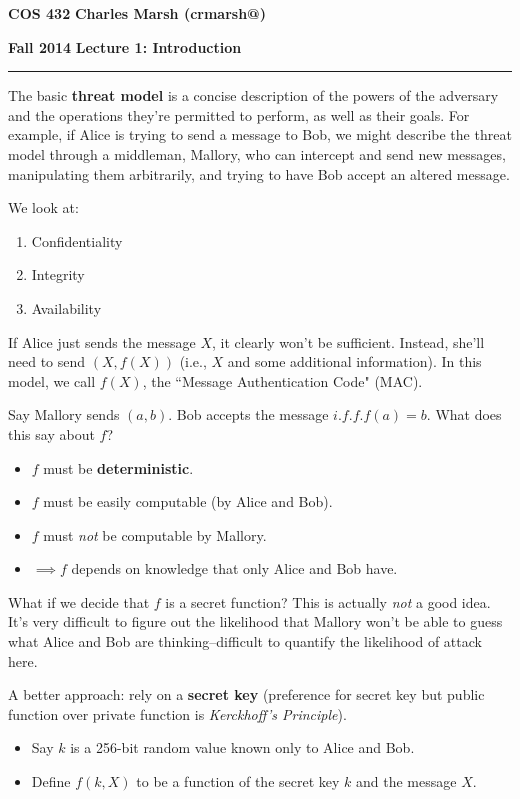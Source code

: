 \documentclass[12pt]{article}
\makeatletter
\newcommand{\myheader}[4]
{\vspace*{-0.5in}
\noindent
{#1} \hfill {#3}

\noindent
{#2} \hfill {#4}

\noindent
\rule[8pt]{\textwidth}{1pt}

\vspace{1ex} 
}  %
\newcommand{\myalgsheader}[0]
{\myheader
{ {\bf{COS 432}} }
{ {\bf{Fall 2014}} }
{ {\bf{Charles Marsh (crmarsh@)}} }
{ {\bf{Lecture 1: Introduction}} }
}
\makeatother
\begin{document}
\myalgsheader

\pagestyle{plain}

The basic \textbf{threat model} is a concise description of the powers of the adversary and the operations they're permitted to perform, as well as their goals. For example, if Alice is trying to send a message to Bob, we might describe the threat model through a middleman, Mallory, who can intercept and send new messages, manipulating them arbitrarily, and trying to have Bob accept an altered message.

We look at:
\begin{enumerate}
\item Confidentiality
\item Integrity
\item Availability
\end{enumerate}

If Alice just sends the message $X$, it clearly won't be sufficient. Instead, she'll need to send $(X, f(X))$ (i.e., $X$ and some additional information). In this model, we call $f(X)$, the ``Message Authentication Code" (MAC).

Say Mallory sends $(a, b)$. Bob accepts the message $i.f.f. f(a) = b$. What does this say about $f$?
\begin{itemize}
\item $f$ must be \textbf{deterministic}.
\item $f$ must be easily computable (by Alice and Bob).
\item $f$ must \textit{not} be computable by Mallory.
\item $\implies f$ depends on knowledge that only Alice and Bob have.
\end{itemize}

What if we decide that $f$ is a secret function? This is actually \textit{not} a good idea. It's very difficult to figure out the likelihood that Mallory won't be able to guess what Alice and Bob are thinking--difficult to quantify the likelihood of attack here.

A better approach: rely on a \textbf{secret key} (preference for secret key but public function over private function is \textit{Kerckhoff's Principle}).
\begin{itemize}
\item Say $k$ is a 256-bit random value known only to Alice and Bob.
\item Define $f(k, X)$ to be a function of the secret key $k$ and the message $X$.
\end{itemize}
\end{document}
